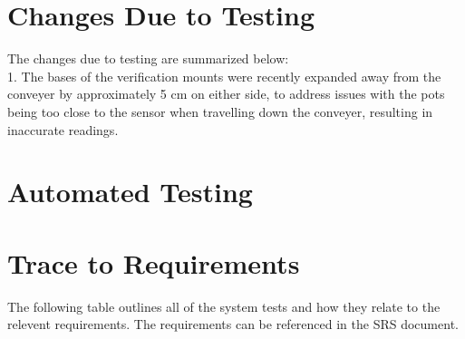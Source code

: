 \documentclass[12pt, titlepage]{article}
\begin{document}
\section{Changes Due to Testing}

The changes due to testing are summarized below:
\\
1. The bases of the verification mounts were recently expanded away from the
conveyer by approximately 5 cm on either side, to address issues with the pots being too close to the sensor when travelling down the conveyer, resulting in inaccurate readings.

\section{Automated Testing}
		
\section{Trace to Requirements}

The following table outlines all of the system tests and how they relate to the
relevent requirements. The requirements can be referenced in the SRS document.\\
\end{document}
